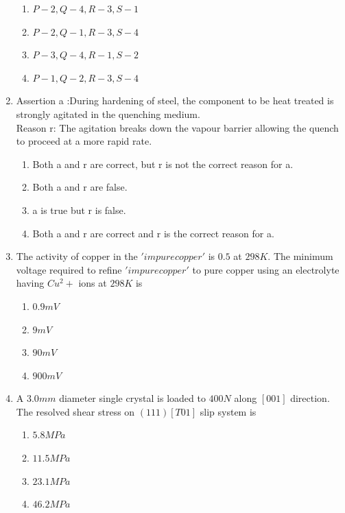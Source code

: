 \documentclass[journal]{IEEEtran}
\theoremstyle{remark}
\begin{document}
\begin{enumerate}
\begin{center}
\begin{tabular}{c c}
\end{tabular}
\end{center}
\begin{multicols}{2}
\begin{enumerate}
    \item $P-2, Q-4, R-3, S-1$
    \item $P-2, Q-1, R-3, S-4$
    \item $P-3, Q-4, R-1, S-2$
    \item $P-1, Q-2, R-3, S-4$
\end{enumerate}
\end{multicols}
\item Assertion a :During hardening of steel, the component to be heat treated is strongly agitated in the quenching medium.\\
Reason r: The agitation breaks down the vapour barrier allowing the quench to proceed at a more rapid rate.
\hfill{}
\begin{enumerate}
    \item Both a and r are correct, but r is not the correct reason for a.
    \item Both a and r are false.
    \item a is true but r is false.
    \item Both a and r are correct and r is the correct reason for a.
\end{enumerate}



\item The activity of copper in the $'impure copper'$ is $0.5$ at $298 K$. The minimum voltage required to refine
$'impure copper'$ to pure copper using an electrolyte having $Cu^2+$ ions at $298 K$ is\hfill{}
\begin{multicols}{4}
\begin{enumerate}
\item $0.9 mV$
\item $9 mV$
\item  $90 mV$
\item  $900 mV$
\end{enumerate}
\end{multicols}

\item  A $3.0 mm$ diameter single crystal is loaded to $400 N$ along $[001]$ direction. The resolved shear stress on
$(111) [T01]$ slip system is
\hfill{}
\begin{multicols}{4}
\begin{enumerate}
\item  $5.8 MPa$
\item  $11.5 MPa$
\item  $23.1 MPa$
\item $46.2 MPa$
\end{enumerate}
\end{multicols}


\end{enumerate}
\end{document}
